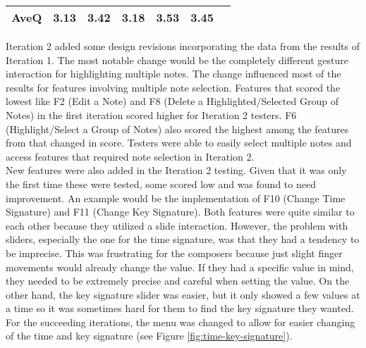 \begin{table}[!htpb]
\begin{tabular}{|R{1.5cm}|R{1cm}|R{1cm}|R{1cm}|R{1cm}|R{1cm}|R{1.5cm}|}
			   \textbf{AveQ} & 3.13 & 3.42 & 3.18 & 3.53 & 3.45 & \\ \hline
			  \end{tabular}
			\end{table}

			Iteration 2 added some design revisions incorporating the data from the results of Iteration 1. The most notable change would be the completely different gesture interaction for highlighting multiple notes. The change influenced most of the results for features involving multiple note selection. Features that scored the lowest like F2 (Edit a Note) and F8 (Delete a Highlighted/Selected Group of Notes) in the first iteration scored higher for Iteration 2 testers. F6 (Highlight/Select a Group of Notes) also scored the highest among the features from that changed in score. Testers were able to easily select multiple notes and access features that required note selection in Iteration 2. \\

			New features were also added in the Iteration 2 testing. Given that it was only the first time these were tested, some scored low and was found to need improvement. An example would be the implementation of F10 (Change Time Signature) and F11 (Change Key Signature). Both features were quite similar to each other because they utilized a slide interaction. However, the problem with sliders, especially the one for the time signature, was that they had a tendency to be imprecise. This was frustrating for the composers because just slight finger movements would already change the value. If they had a specific value in mind, they needed to be extremely precise and careful when setting the value. On the other hand, the key signature slider was easier, but it only showed a few values at a time so it was sometimes hard for them to find the key signature they wanted. For the succeeding iterations, the menu was changed to allow for easier changing of the time and key signature (see Figure \ref{fig:time-key-signature}).

			\begin{comment}
			\begin{figure}[h]
				\centering
				\texttt{[image: figures/before-now-timesigmenu]}
			    \caption{The time and key signature menu before and after changes were made due to the user testing.}
			    \label{fig:time-key-signature}
			\end{figure}
			\end{comment}

